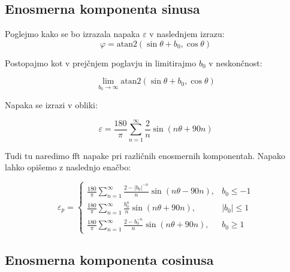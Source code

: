 \subsection{Enosmerna komponenta sinusa}

Poglejmo kako se bo izrazala napaka $\varepsilon$ v naslednjem izrazu:
\begin{equation}
\varphi = \mathrm{atan2}(\sin{\theta} + b_0,\cos{\theta})
\end{equation}

Postopajmo kot v prejčnjem poglavju in limitirajmo $b_0$ v neskončnost:

\begin{equation}
\lim_{b_0 \rightarrow \infty} \mathrm{atan2}(\sin{\theta}+b_0,\cos{\theta})
\end{equation}


Napaka se izrazi v obliki:

\begin{equation}
\varepsilon = \frac{180}{\pi}\sum_{n=1}^{\infty}\frac{2}{n} \sin (n \theta + 90 n)
\end{equation}


Tudi tu naredimo fft napake pri različnih enosmernih komponentah. Napako lahko opišemo z naslednjo enačbo:

\begin{equation}
\label{vrsta_sinoff}
\varepsilon_p=
\begin{cases}
\frac{180}{\pi}\sum_{n=1}^{\infty}\frac{2-|b_0|^{-n}}{n} \sin (n \theta -  90 n), & b_0\leq -1 \\
\frac{180}{\pi}\sum_{n=1}^{\infty}\frac{b_0^n}{n} \sin (n \theta + 90 n), & |b_0|\leq 1 \\
\frac{180}{\pi}\sum_{n=1}^{\infty}\frac{2-b_0^{-n}}{n} \sin (n \theta + 90 n), & b_0\geq 1
\end{cases}
\end{equation}





\subsection{Enosmerna komponenta cosinusa}

